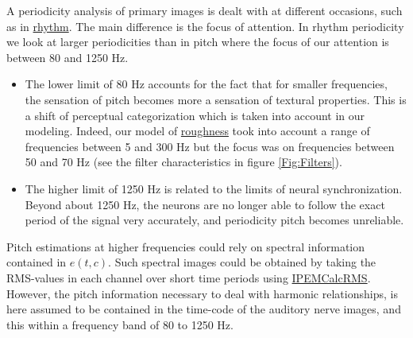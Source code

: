 A periodicity analysis of primary images is dealt with at
different occasions, such as in
\hyperlink{Concepts:RhythmModule}{rhythm}. The main difference is
the focus of attention. In rhythm periodicity we look at larger
periodicities than in pitch where the focus of our attention is
between 80 and 1250 Hz.
\begin{itemize}
\item
    The lower limit of 80 Hz accounts for the fact that for smaller frequencies,
    the sensation of pitch becomes more a sensation of textural properties.
    This is a shift of perceptual categorization which is taken into account
    in our modeling. Indeed, our model of \hyperlink{Concepts:RoughnessModule}{roughness}
    took into account a range of frequencies between 5 and 300 Hz but
    the focus was on frequencies between 50 and 70 Hz (see the filter characteristics
    in figure \ref{Fig:Filters}).
\item
    The higher limit of 1250 Hz is related to the limits of neural synchronization.
    Beyond about 1250 Hz, the neurons are no longer able to follow the exact
    period of the signal very accurately, and periodicity pitch becomes unreliable.
\end{itemize}
Pitch estimations at higher frequencies could rely on spectral
information contained in $e(t,c)$. Such spectral images could be
obtained by taking the RMS-values in each channel over short time
periods using \hyperlink{FuncRef:IPEMCalcRMS}{IPEMCalcRMS}.
However, the pitch information necessary to deal with harmonic
relationships, is here assumed to be contained in the time-code of
the auditory nerve images, and this within a frequency band of 80
to 1250 Hz.

